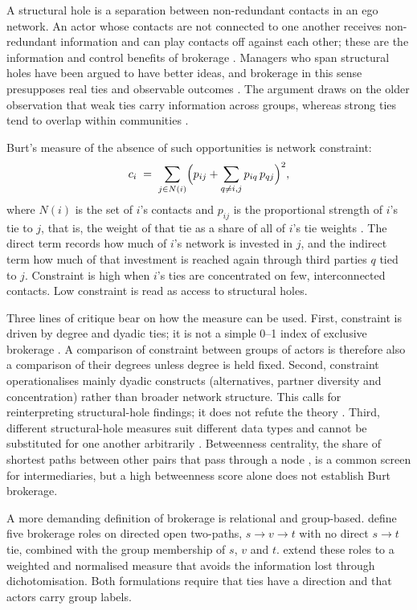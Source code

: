 A structural hole is a separation between non-redundant contacts in an ego network. An actor whose contacts are not connected to one another receives non-redundant information and can play contacts off against each other; these are the information and control benefits of brokerage \citep{burt1992structural}. Managers who span structural holes have been argued to have better ideas, and brokerage in this sense presupposes real ties and observable outcomes \citep{burt2004structural}. The argument draws on the older observation that weak ties carry information across groups, whereas strong ties tend to overlap within communities \citep{granovetter1973strength}.

Burt's measure of the absence of such opportunities is network constraint:
\begin{equation}
c_i \;=\; \sum_{j \in N(i)} \Bigl( p_{ij} + \sum_{q \neq i,j} p_{iq}\, p_{qj} \Bigr)^{2},
\label{eq:constraint}
\end{equation}
where $N(i)$ is the set of $i$'s contacts and $p_{ij}$ is the proportional strength of $i$'s tie to $j$, that is, the weight of that tie as a share of all of $i$'s tie weights \citep{burt1992structural}. The direct term records how much of $i$'s network is invested in $j$, and the indirect term how much of that investment is reached again through third parties $q$ tied to $j$. Constraint is high when $i$'s ties are concentrated on few, interconnected contacts. Low constraint is read as access to structural holes.

Three lines of critique bear on how the measure can be used. First, constraint is driven by degree and dyadic ties; it is not a simple 0--1 index of exclusive brokerage \citep{everett2020unpacking}. A comparison of constraint between groups of actors is therefore also a comparison of their degrees unless degree is held fixed. Second, constraint operationalises mainly dyadic constructs (alternatives, partner diversity and concentration) rather than broader network structure. This calls for reinterpreting structural-hole findings; it does not refute the theory \citep{johnson2026reassessing}. Third, different structural-hole measures suit different data types and cannot be substituted for one another arbitrarily \citep{saglietto2020research}. Betweenness centrality, the share of shortest paths between other pairs that pass through a node \citep{freeman1977set}, is a common screen for intermediaries, but a high betweenness score alone does not establish Burt brokerage.

A more demanding definition of brokerage is relational and group-based. \citet{gould1989structures} define five brokerage roles on directed open two-paths, $s \rightarrow v \rightarrow t$ with no direct $s \rightarrow t$ tie, combined with the group membership of $s$, $v$ and $t$. \citet{zador2022weighted} extend these roles to a weighted and normalised measure that avoids the information lost through dichotomisation. Both formulations require that ties have a direction and that actors carry group labels.

